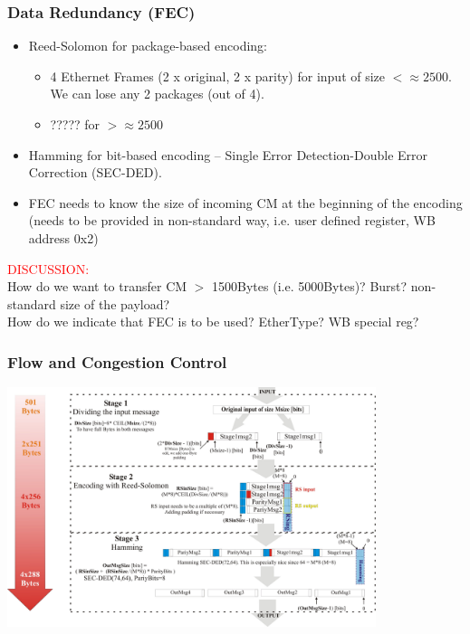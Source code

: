\documentclass[]{beamer}
\begin{document}
\begin{frame}
  \frametitle{Data Redundancy (FEC)}   

      \begin{itemize}
      \item Reed-Solomon for package-based encoding:
	\begin{itemize}
	\item  4 Ethernet Frames (2 x original, 2 x parity) for input of size 
	      $<\approx2500$. We can lose any 2 packages (out of 4).
	\item  ????? for $>\approx2500$
	\end{itemize}
      \item Hamming for bit-based encoding -- Single Error Detection-Double
	    Error Correction (SEC-DED).
      \item FEC needs to know the size of incoming CM at the beginning of the
	  encoding (needs to be provided in non-standard way, i.e. user defined
	  register, WB address 0x2)
      \end{itemize}

\centering
\textcolor{red}{DISCUSSION:} \\
{\small
How do we want to transfer CM $>$ 1500Bytes (i.e. 5000Bytes)? Burst?
non-standard size of the payload? \\
How do we indicate that FEC is to be used? EtherType? WB special reg? 
}
\end{frame}

\begin{frame}
  \frametitle{Flow and Congestion Control }
\centering
\includegraphics[height=7cm,keepaspectratio]{robustness/FECflow.pdf}

\end{frame}
\end{document}
